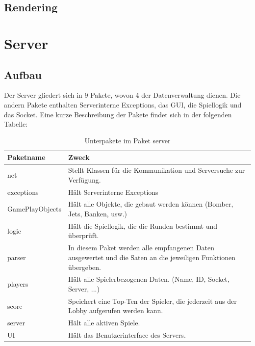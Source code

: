 \documentclass[ngerman, 12pt, pdftex]{scrartcl}[2006/07/30]
\begin{document}
\subsection{Rendering}


\section{Server}
\subsection{Aufbau}
Der Server gliedert sich in 9 Pakete, wovon 4 der Datenverwaltung dienen. Die andern Pakete enthalten Serverinterne Exceptions, das GUI, die Spiellogik und das Socket.
Eine kurze Beschreibung der Pakete findet sich in der folgenden Tabelle:
\begin{table}[h!]
\begin{tabular}{ l p{12cm} }
  Paketname & Zweck \\ \hline
  
  net &  
  Stellt Klassen für die Kommunikation und Serversuche zur Verfügung. \\
  
  exceptions & 
  Hält Serverinterne Exceptions\\
  
  GamePlayObjects &
  Hält alle Objekte, die gebaut werden können (Bomber, Jets, Banken, usw.)\\
  
  logic &
  Hält die Spiellogik, die die Runden bestimmt und überprüft.\\
  
  parser &
  In diesem Paket werden alle empfangenen Daten ausgewertet und die Saten an die jeweiligen Funktionen übergeben.\\
  
  players &
  Hält alle Spielerbezogenen Daten. (Name, ID, Socket, Server, ...)\\
  
  score &
  Speichert eine Top-Ten der Spieler, die jederzeit aus der Lobby aufgerufen werden kann.\\
  
  server &
  Hält alle aktiven Spiele.\\
  
  UI &
  Hält das Benutzerinterface des Servers.\\
  
 
\end{tabular}
\caption{Unterpakete im Paket server}
\end{table}
\end{document}
